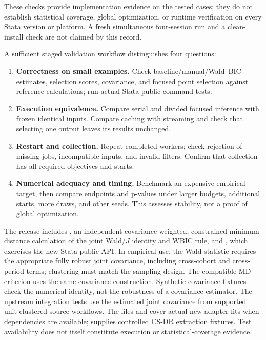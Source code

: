 \documentclass[11pt]{article}
\begin{document}
These checks provide implementation evidence on the tested cases; they do
not establish statistical coverage, global optimization, or runtime
verification on every Stata version or platform. A fresh simultaneous
four-session run and a clean-install check are not claimed by this record.

A sufficient staged validation workflow distinguishes four questions:
\begin{enumerate}
\item \textbf{Correctness on small examples.} Check baseline/manual/Wald--BIC
estimates, selection scores, covariance, and focused point selection against
reference calculations; run actual Stata public-command tests.
\item \textbf{Execution equivalence.} Compare serial and divided focused
inference with frozen identical inputs. Compare caching with streaming and
check that selecting one output leaves its results unchanged.
\item \textbf{Restart and collection.} Repeat completed workers; check rejection
of missing jobs, incompatible inputs, and invalid filters. Confirm that
collection has all required objectives and starts.
\item \textbf{Numerical adequacy and timing.} Benchmark an expensive empirical
target, then compare endpoints and p-values under larger budgets, additional
starts, more draws, and other seeds. This assesses stability, not a proof of
global optimization.
\end{enumerate}
The release includes , an independent
covariance-weighted, constrained minimum-distance calculation of the joint
Wald/$J$ identity and WBIC rule, and , which
exercises the new Stata public API. In empirical use, the Wald statistic
requires the appropriate fully robust joint covariance, including
cross-cohort and cross-period terms; clustering must match the sampling
design. The compatible MD criterion uses the same covariance construction.
Synthetic covariance fixtures check the numerical identity, not the
robustness of a covariance estimator. The upstream integration tests use the
estimated joint covariance from supported unit-clustered source workflows.
The files  and
 cover actual new-adapter fits when
dependencies are available;  supplies controlled
CS-DR extraction fixtures. Test availability does not itself constitute
execution or statistical-coverage evidence.
\end{document}
